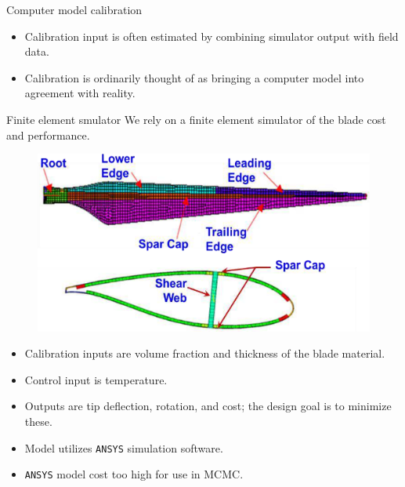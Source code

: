 \documentclass[final]{beamer}
\newlength{\onecolwid}
\begin{document}
\begin{frame}[t]
\begin{columns}[t]
\begin{column}{\onecolwid}
\begin{alertblock}{Computer model calibration}
\begin{itemize}
\item Calibration input is often estimated by combining simulator output with field data. 

\item Calibration is ordinarily thought of as bringing a computer model into agreement with reality.

\end{itemize}

\end{alertblock}


\begin{alertblock}{Finite element smulator}
We rely on a finite element simulator of the blade cost and performance.

\begin{figure}[h!]
\includegraphics[width=0.6\linewidth]{blade3}
\label{blade}
\end{figure}

\vspace{-18mm}
\begin{itemize}
\item Calibration inputs are volume fraction and thickness of the blade material.

\item Control input is temperature.

\item Outputs are tip deflection, rotation, and cost; the design goal is to minimize these.

\item Model utilizes \texttt{ANSYS} simulation software.

\item \texttt{ANSYS} model cost too high for use in MCMC.

\end{itemize}
\end{alertblock}


\end{column}
\end{columns}
\end{frame}
\end{document}
